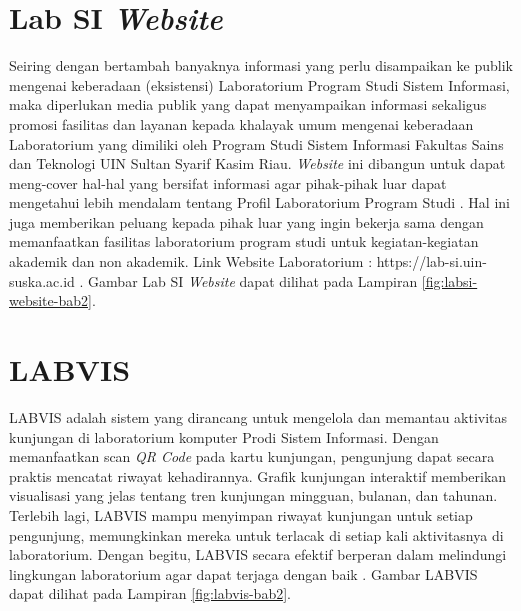 

\section{Lab SI \textit{Website}}
Seiring dengan bertambah banyaknya informasi yang perlu disampaikan ke publik mengenai keberadaan (eksistensi) Laboratorium Program Studi Sistem Informasi, maka diperlukan media publik yang dapat menyampaikan informasi sekaligus promosi fasilitas dan layanan kepada khalayak umum mengenai keberadaan Laboratorium yang dimiliki oleh Program Studi Sistem Informasi Fakultas Sains dan Teknologi UIN Sultan Syarif Kasim Riau. \textit{Website} ini dibangun untuk dapat meng-cover hal-hal yang bersifat informasi agar pihak-pihak luar dapat mengetahui lebih mendalam tentang Profil Laboratorium Program Studi \cite{kusuma2024penerapan}. Hal ini juga memberikan peluang kepada pihak luar yang ingin bekerja sama dengan memanfaatkan fasilitas laboratorium program studi untuk kegiatan-kegiatan akademik dan non akademik.  Link Website Laboratorium : https://lab-si.uin-suska.ac.id \cite{web-prodi}. Gambar Lab SI \textit{Website} dapat dilihat pada Lampiran \ref{fig:labsi-website-bab2}.

\section{LABVIS}
LABVIS adalah sistem yang dirancang untuk mengelola dan memantau aktivitas kunjungan di laboratorium komputer Prodi Sistem Informasi. Dengan memanfaatkan scan \textit{QR Code} pada kartu kunjungan, pengunjung dapat secara praktis mencatat riwayat kehadirannya. Grafik kunjungan interaktif memberikan visualisasi yang jelas tentang tren kunjungan mingguan, bulanan, dan tahunan. Terlebih lagi, LABVIS mampu menyimpan riwayat kunjungan untuk setiap pengunjung, memungkinkan mereka untuk terlacak di setiap kali aktivitasnya di laboratorium. Dengan begitu, LABVIS secara efektif berperan dalam melindungi lingkungan laboratorium agar dapat terjaga dengan baik \cite{web-prodi}. Gambar LABVIS dapat dilihat pada Lampiran \ref{fig:labvis-bab2}.

